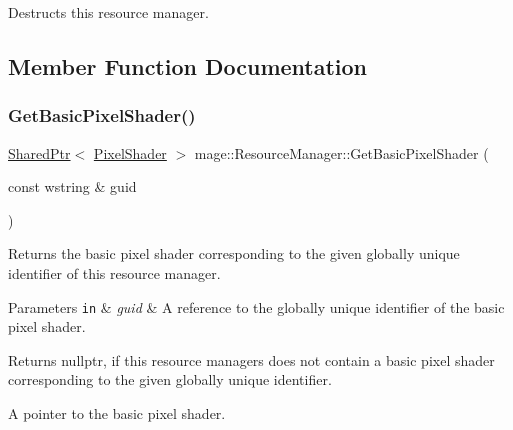 Destructs this resource manager. 

\subsection{Member Function Documentation}
\hypertarget{classmage_1_1_resource_manager_a68ad57f1d907c348540f94810e7b3fe0}{}\label{classmage_1_1_resource_manager_a68ad57f1d907c348540f94810e7b3fe0} 
\subsubsection{\texorpdfstring{Get\+Basic\+Pixel\+Shader()}{GetBasicPixelShader()}}
{\footnotesize\ttfamily \hyperlink{namespacemage_a1e01ae66713838a7a67d30e44c67703e}{Shared\+Ptr}$<$ \hyperlink{classmage_1_1_pixel_shader}{Pixel\+Shader} $>$ mage\+::\+Resource\+Manager\+::\+Get\+Basic\+Pixel\+Shader (\begin{DoxyParamCaption}\item[{const wstring \&}]{guid }\end{DoxyParamCaption})\hspace{0.3cm}{\ttfamily [noexcept]}}

Returns the basic pixel shader corresponding to the given globally unique identifier of this resource manager.


\begin{DoxyParams}[1]{Parameters}
\mbox{\tt in}  & {\em guid} & A reference to the globally unique identifier of the basic pixel shader. \\
\hline
\end{DoxyParams}
\begin{DoxyReturn}{Returns}
{\ttfamily nullptr}, if this resource managers does not contain a basic pixel shader corresponding to the given globally unique identifier. 

A pointer to the basic pixel shader. 
\end{DoxyReturn}
\hypertarget{classmage_1_1_resource_manager_a4a2b80e522616f6c5f23eae197f5c3dd}{}\label{classmage_1_1_resource_manager_a4a2b80e522616f6c5f23eae197f5c3dd} 
